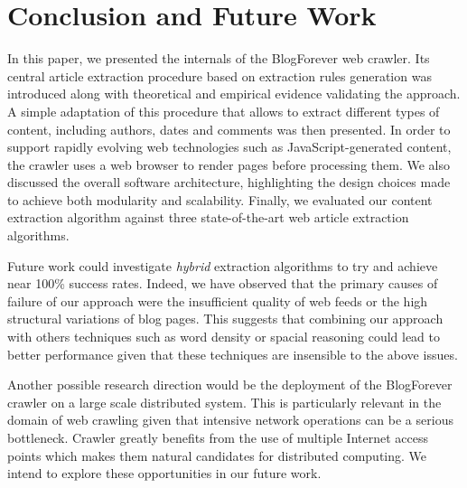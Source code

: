 \section{Conclusion and Future Work}
\label{conclusionandfuturework}

In this paper, we presented the internals of the BlogForever web crawler. Its central article extraction procedure based on extraction rules generation was introduced along with theoretical and empirical evidence validating the approach. A simple adaptation of this procedure that allows to extract different types of content, including authors, dates and comments was then presented. In order to support rapidly evolving web technologies such as JavaScript-generated content, the crawler uses a web browser to render pages before processing them. We also discussed the overall software architecture, highlighting the design choices made to achieve both modularity and scalability. Finally, we evaluated our content extraction algorithm against three state-of-the-art web article extraction algorithms.


Future work could investigate \emph{hybrid} extraction algorithms to try and achieve near 100\% success rates. Indeed, we have observed that the primary causes of failure of our approach were the insufficient quality of web feeds or the high structural variations of blog pages. This suggests that combining our approach with others techniques such as word density or spacial reasoning could lead to better performance given that these techniques are insensible to the above issues.

Another possible research direction would be the deployment of the BlogForever crawler on a large scale distributed system. This is particularly relevant in the domain of web crawling given that intensive network operations can be a serious bottleneck. Crawler greatly benefits from the use of multiple Internet access points which makes them natural candidates for distributed computing. We intend to explore these opportunities in our future work.
